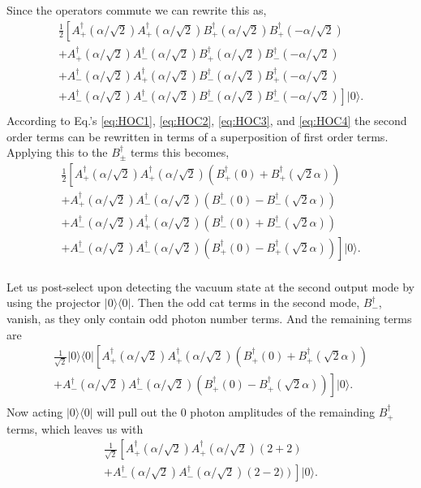 \documentclass[aps,prl,twocolumn,amsmath,amssymb,nofootinbib,superscriptaddress]{revtex4}
\newcommand{\bra}[1]{\langle#1|}
\newcommand{\ket}[1]{|#1\rangle}
\begin{document}
Since the operators commute we can rewrite this as,
\begin{eqnarray}
\frac{1}{2}\left[A_+^\dag(\alpha/\sqrt{2}) A_+^\dag(\alpha/\sqrt{2}) B_+^\dag(\alpha/\sqrt{2})  B_+^\dag(-\alpha/\sqrt{2}) \right. \nonumber \\
+ A_+^\dag(\alpha/\sqrt{2}) A_-^\dag(\alpha/\sqrt{2}) B_+^\dag(\alpha/\sqrt{2}) B_-^\dag(-\alpha/\sqrt{2}) \nonumber \\
+ A_-^\dag(\alpha/\sqrt{2})A_+^\dag(\alpha/\sqrt{2})B_-^\dag(\alpha/\sqrt{2})  B_+^\dag(-\alpha/\sqrt{2}) \nonumber \\
\left.+ A_-^\dag(\alpha/\sqrt{2}) A_-^\dag(\alpha/\sqrt{2})B_-^\dag(\alpha/\sqrt{2})B_-^\dag(-\alpha/\sqrt{2})\right] \ket{0}.\nonumber \\
\end{eqnarray}
According to Eq.'s \ref{eq:HOC1}, \ref{eq:HOC2}, \ref{eq:HOC3}, and \ref{eq:HOC4} the second order terms can be rewritten in terms of a superposition of first order terms. Applying this to the $B_{\pm}^{\dag}$ terms this becomes,
\begin{eqnarray}
\frac{1}{2}\left[A_+^\dag(\alpha/\sqrt{2}) A_+^\dag(\alpha/\sqrt{2}) \left(B_+^\dag(0)+  B_+^\dag(\sqrt{2}\alpha)\right) \right.\nonumber \\
+ A_+^\dag(\alpha/\sqrt{2}) A_-^\dag(\alpha/\sqrt{2}) \left(B_-^\dag(0)-  B_-^\dag(\sqrt{2}\alpha)\right) \nonumber \\
+ A_-^\dag(\alpha/\sqrt{2})A_+^\dag(\alpha/\sqrt{2})\left(B_-^\dag(0)+  B_-^\dag(\sqrt{2}\alpha)\right) \nonumber \\
\left.+ A_-^\dag(\alpha/\sqrt{2}) A_-^\dag(\alpha/\sqrt{2})\left(B_+^\dag(0)-  B_+^\dag(\sqrt{2}\alpha)\right)\right]\ket{0}.\nonumber \\
\end{eqnarray}

Let us post-select upon detecting the vacuum state at the second output mode by using the projector $\ket{0}\bra{0}$. Then the odd cat terms in the second mode, $B_-^\dag$, vanish, as they only contain odd photon number terms. And the remaining terms are
\begin{eqnarray}
\frac{1}{\sqrt{2}}\ket{0}\bra{0}\left[A_+^\dag(\alpha/\sqrt{2}) A_+^\dag(\alpha/\sqrt{2}) \left(B_+^\dag(0)+  B_+^\dag(\sqrt{2}\alpha)\right) \right.\nonumber \\
\left.+ A_-^\dag(\alpha/\sqrt{2}) A_-^\dag(\alpha/\sqrt{2})\left(B_+^\dag(0)-  B_+^\dag(\sqrt{2}\alpha)\right)\right]\ket{0} .\nonumber \\
\end{eqnarray}
Now acting $\ket{0}\bra{0}$ will pull out the $0$ photon amplitudes of the remainding $B_+^{\dag}$ terms, which leaves us with
\begin{eqnarray}
\frac{1}{\sqrt{2}}\left[A_+^\dag(\alpha/\sqrt{2}) A_+^\dag(\alpha/\sqrt{2}) \left(2+ 2\right) \right.\nonumber \\
\left.+ A_-^\dag(\alpha/\sqrt{2}) A_-^\dag(\alpha/\sqrt{2})\left(2-  2)\right)\right]\ket{0}.\nonumber \\
\end{eqnarray}
\end{document}

